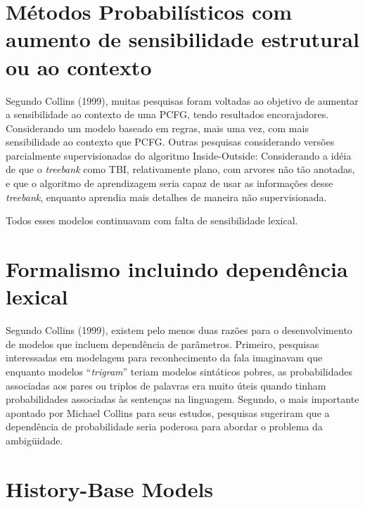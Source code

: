 \section{Métodos Probabilísticos com aumento de sensibilidade estrutural ou ao contexto}
\label{sec:aumento_sensibilidade}

Segundo Collins (1999), muitas pesquisas foram voltadas ao objetivo de aumentar a sensibilidade ao contexto de uma PCFG, tendo resultados encorajadores.
Considerando um modelo baseado em regras, mais uma vez, com mais sensibilidade ao contexto que PCFG. Outras pesquisas considerando versões parcialmente supervisionadas do algoritmo Inside-Outside:
Considerando a idéia de que o \emph{treebank} como TBI, relativamente plano, com arvores não tão anotadas, e que o algoritmo de aprendizagem seria capaz de usar as informações desse \emph{treebank}, enquanto aprendia mais detalhes de maneira não supervisionada.

Todos esses modelos continuavam com falta de sensibilidade lexical.


\section{Formalismo incluindo dependência lexical}
\label{sec:dependencia_lexical}

Segundo Collins (1999), existem pelo menos duas razões para o desenvolvimento de modelos que incluem dependência de parâmetros. Primeiro, pesquisas interessadas em modelagem para reconhecimento da fala imaginavam que enquanto modelos ``\emph{trigram}'' teriam modelos sintáticos pobres, as probabilidades associadas aos pares ou triplos de palavras era muito úteis quando tinham probabilidades associadas às sentenças na linguagem.
Segundo, o mais importante apontado por Michael Collins para seus estudos, pesquisas sugeriram que a dependência de probabilidade seria poderosa para abordar o problema da ambigüidade.


\section{History-Base Models}
\label{sec:hbm}



